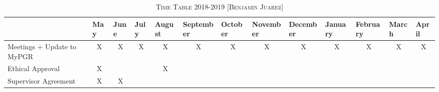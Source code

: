 \documentclass[a4paper,10pt]{article}
\date{}
\begin{document}

% 

\thispagestyle{empty}

\begin{table}[]
\centering
\caption{\textsc{Time Table 2018-2019 [Benjamin Juarez]}} 
\label{my-label}
\begin{tabular}{|l|c|c|c|c|c|c|c|c|c|c|c|c|}
\hline & \multicolumn{1}{l|}{May} & \multicolumn{1}{l|}{June} & \multicolumn{1}{l|}{July} & \multicolumn{1}{l|}{August} & \multicolumn{1}{l|}{September} & \multicolumn{1}{l|}{October} & \multicolumn{1}{l|}{November} & \multicolumn{1}{l|}{December} & \multicolumn{1}{l|}{January} & \multicolumn{1}{l|}{February} & \multicolumn{1}{l|}{March} & \multicolumn{1}{l|}{April} 
                                     \\ \hline \hline
Meetings + Update to MyPGR           & X                        & X                         & X                         & X                           & X                              & X                            & X                             & X                             & X                            & X                             & X                          & X                          \\ \hline
Ethical Approval                     & X                        &                           &                           & X                           &                                &                              &                               &                               &                              &                               &                            &                            \\ \hline
Supervisor Agreement                 & X                        & X                          &                           &                             &                                &                              &                               &                               &                              &                               &                            &                            \\ \hline

\end{tabular}
\end{table}
\end{document}
